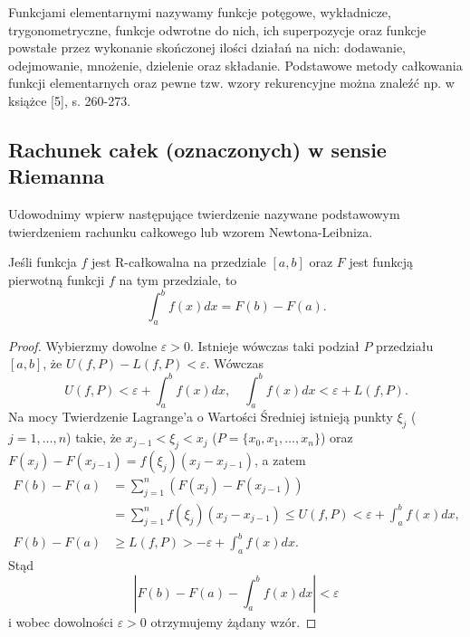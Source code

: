 \documentclass[leqno]{article}
\begin{document}
\begin{justify}
\begin{ex}
\end{ex}

\begin{uwaga}
    Funkcjami elementarnymi nazywamy funkcje potęgowe, wykładnicze, trygonometryczne, funkcje odwrotne do nich, ich superpozycje oraz funkcje
    powstałe przez wykonanie skończonej ilości działań na nich: dodawanie, odejmowanie, mnożenie,
    dzielenie oraz składanie. 
    Podstawowe metody całkowania funkcji elementarnych oraz pewne tzw. wzory rekurencyjne można znaleźć np.
    w książce [5], s. 260-273. 
\end{uwaga}

\subsection{Rachunek całek (oznaczonych) w sensie Riemanna}
Udowodnimy wpierw następujące twierdzenie nazywane podstawowym twierdzeniem rachunku całkowego
lub wzorem Newtona-Leibniza.

\begin{theorem}
{
    Jeśli funkcja $f$ jest R-całkowalna na przedziale $[a,b]$ oraz $F$ jest funkcją pierwotną funkcji $f$ na tym przedziale, to
    \begin{equation*}
        \int_{a}^{b}f(x)dx = F(b) - F(a).
    \end{equation*}
}
\end{theorem}

\begin{proof}
    Wybierzmy dowolne $\varepsilon > 0$. Istnieje wówczas taki podział $P$ przedziału $[a,b]$, że
    $U(f, P) - L(f, P) < \varepsilon$. Wówczas
    \begin{equation*}
        U(f, P) < \varepsilon + \int_{a}^{b}f(x)dx, \quad \int_{a}^{b}f(x)dx < \varepsilon + L(f, P).
    \end{equation*}
    Na mocy Twierdzenie Lagrange'a o Wartości Średniej istnieją punkty $\xi_{j}$ ($j = 1,\ldots, n$) takie, że
    $x_{j-1} < \xi_{j} < x_{j}$ ($P = \{ x_0, x_1, \ldots, x_n\}$) oraz $F(x_j) - F(x_{j-1}) =
    f(\xi_j)(x_j - x_{j-1})$, a zatem
    \begin{equation*}
        \begin{split}
            F(b) - F(a) &= \sum_{j=1}^{n}(F(x_j) - F(x_{j-1})) \\
                        &= \sum_{j=1}^{n}f(\xi_j)(x_j - x_{j-1}) \leqslant U(f, P) < \varepsilon + \int_{a}^{b}f(x)dx, \\
            F(b) - F(a) &\geqslant L(f, P) > -\varepsilon + \int_{a}^{b}f(x)dx.            
        \end{split}
    \end{equation*}
    Stąd
    \begin{equation*}
        \left|F(b) - F(a) - \int_{a}^{b}f(x)dx \right| < \varepsilon
    \end{equation*}
    i wobec dowolności $\varepsilon > 0$ otrzymujemy żądany wzór.
\end{proof}


\end{justify}
\end{document}
